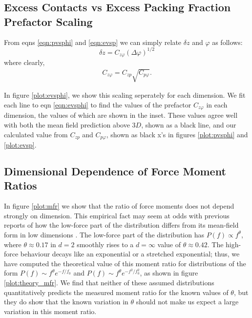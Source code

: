 \subsection{Excess Contacts vs Excess Packing Fraction Prefactor Scaling}

From eqns \ref{eqn:pvsphi} and \ref{eqn:evsp} 
we can simply relate $\delta z$ and $\varphi$ as follows:
%
\begin{equation}
\delta z=C_{z\varphi}\left(\Delta\varphi\right)^{1/2} \label{eqn:evsphi}
\end{equation}
%
where clearly, 
\begin{align}
C_{z\varphi}=C_{zp}\sqrt{C_{p\varphi}}. \label{eqn:consistency}
\end{align}

In figure \ref{plot:evsphi}, we show this scaling seperately for each dimension. We fit each line to eqn \ref{eqn:evsphi} to find the values of the prefactor $C_{z\varphi}$ in each dimension, the values of which are shown in the inset. These values agree well with both the mean field prediction above $3D$, shown as a black line, and our calculated value from $C_{zp}$ and $C_{p\varphi}$, shown as black x's in figures \ref{plot:pvsphi} 
and \ref{plot:evsp}.

%
\subsection{Dimensional Dependence of Force Moment Ratios}
In figure \ref{plot:mfr} we show that the ratio of force moments does not depend strongly on dimension. This empirical fact may seem at odds with previous reports of how the low-force part of the distribution differs from its mean-field form in low dimensions \cite{charbonneau_jamming_2015,mueth_force_1998}. The low-force part of the distribution has $P(f) \propto f^\theta$, where $\theta\approx 0.17$ in $d=2$ smoothly rises to a $d=\infty$ value of $\theta \approx 0.42$. The high-force behaviour decays like an exponential or a stretched exponential; thus, we have computed the theoretical value of this moment ratio for distributions of the form $P(f) \sim f^\theta e^{-f /f_0}$ and $P(f) \sim f^\theta e^{-f^2 /f_0^2}$, as shown in figure \ref{plot:theory_mfr}. We find that neither of these assumed distributions quantitatively predicts the measured moment ratio for the known values of $\theta$, but they do show that the known variation in $\theta$ should not make us expect a large variation in this moment ratio.



